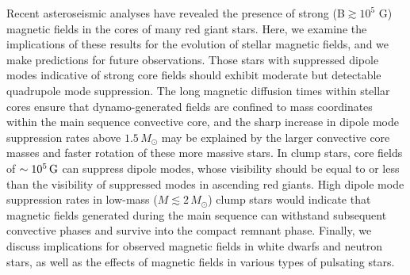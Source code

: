 Recent asteroseismic analyses have revealed the presence of strong (B$\gtrsim 10^5$ G) magnetic fields in the cores of many red giant stars. 
Here, we examine the implications of these results for the  evolution of stellar  magnetic fields, and we make predictions for future observations. Those stars with suppressed dipole modes indicative of strong core fields should exhibit moderate but detectable quadrupole mode suppression.
The long magnetic diffusion times within stellar cores ensure that dynamo-generated fields are confined to mass coordinates within the main sequence convective core, and the sharp increase in dipole mode suppression rates above $1.5 \, M_\odot$ may be explained by the larger convective core masses and faster rotation of these more massive stars.
In clump stars, core fields of $\sim 10^5 \, {\rm G}$ can suppress dipole modes, whose visibility should be equal to or less than the visibility of suppressed modes in ascending red giants. High dipole mode suppression rates in low-mass ($M \lesssim 2 \, M_\odot$) clump stars would indicate that magnetic fields generated during the main sequence can withstand subsequent convective phases and survive into the compact remnant phase. Finally, we discuss implications for observed magnetic fields in white dwarfs and neutron stars, as well as the effects of magnetic fields in various types of pulsating stars.
  
  
  
  
  
  
  